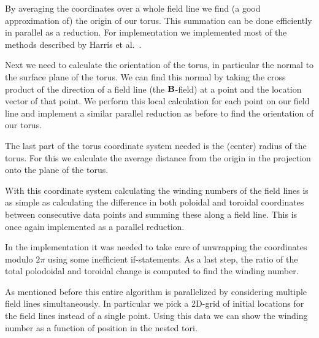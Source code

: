 \documentclass{article}
\renewcommand{\vec}{\bold}
\begin{document}
By averaging the coordinates over a whole field line we find (a good approximation of) the origin of our torus. This summation can be done efficiently in parallel as a reduction. For implementation we implemented most of the methods described by Harris et al.~\cite{harris2007optimizing}.

Next we need to calculate the orientation of the torus, in particular the normal to the surface plane of the torus. 
We can find this normal by taking the cross product of the direction of a field line (the $\vec{B}$-field) at a point and the location vector of that point. We perform this local calculation for each point on our field line and implement a similar parallel reduction as before to find the orientation of our torus.

The last part of the torus coordinate system needed is the (center) radius of the torus. For this we calculate the average distance from the origin in the projection onto the plane of the torus. %

With this coordinate system calculating the winding numbers of the field lines is as simple as calculating the difference in both poloidal and toroidal coordinates between consecutive data points and summing these along a field line. This is once again implemented as a parallel reduction.

In the implementation it was needed to take care of unwrapping the coordinates modulo $2\pi$ using some inefficient if-statements. %
As a last step, the ratio of the total polodoidal and toroidal change is computed to find the winding number.

As mentioned before this entire algorithm is parallelized by considering multiple field lines simultaneously. In particular we pick a 2D-grid of initial locations for the field lines instead of a single point. Using this data we can show the winding number as a function of position in the nested tori.\\
\end{document}
